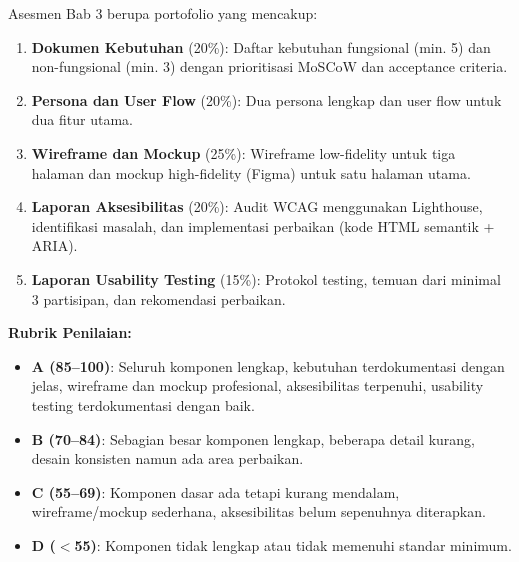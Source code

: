\documentclass[../main.tex]{subfiles}
\begin{document}
\begin{asesmen}
Asesmen Bab 3 berupa portofolio yang mencakup:
\begin{enumerate}
  \item \textbf{Dokumen Kebutuhan} (20\%): Daftar kebutuhan fungsional (min. 5) dan non-fungsional (min. 3) dengan prioritisasi MoSCoW dan acceptance criteria.
  \item \textbf{Persona dan User Flow} (20\%): Dua persona lengkap dan user flow untuk dua fitur utama.
  \item \textbf{Wireframe dan Mockup} (25\%): Wireframe low-fidelity untuk tiga halaman dan mockup high-fidelity (Figma) untuk satu halaman utama.
  \item \textbf{Laporan Aksesibilitas} (20\%): Audit WCAG menggunakan Lighthouse, identifikasi masalah, dan implementasi perbaikan (kode HTML semantik + ARIA).
  \item \textbf{Laporan Usability Testing} (15\%): Protokol testing, temuan dari minimal 3 partisipan, dan rekomendasi perbaikan.
\end{enumerate}

\textbf{Rubrik Penilaian:}
\begin{itemize}
  \item \textbf{A (85--100)}: Seluruh komponen lengkap, kebutuhan terdokumentasi dengan jelas, wireframe dan mockup profesional, aksesibilitas terpenuhi, usability testing terdokumentasi dengan baik.
  \item \textbf{B (70--84)}: Sebagian besar komponen lengkap, beberapa detail kurang, desain konsisten namun ada area perbaikan.
  \item \textbf{C (55--69)}: Komponen dasar ada tetapi kurang mendalam, wireframe/mockup sederhana, aksesibilitas belum sepenuhnya diterapkan.
  \item \textbf{D ($<$55)}: Komponen tidak lengkap atau tidak memenuhi standar minimum.
\end{itemize}
\end{asesmen}
\end{document}
